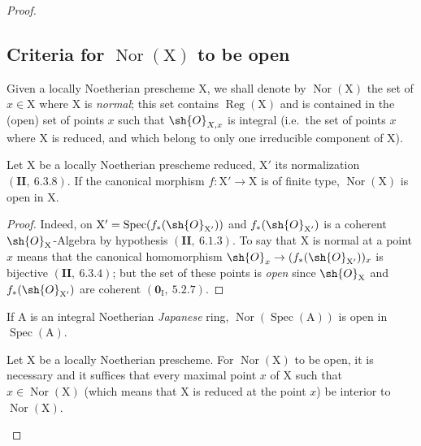 \begin{proof}
\subsection{Criteria for \texorpdfstring{$\operatorname{Nor}(\mathrm{X})$}{Nor(X)} to be open}
\label{subsection:IV.6.13}

\begin{env}[6.13.1]
\label{IV.6.13.1}
Given a locally Noetherian prescheme $\mathrm{X}$, we shall denote by
$\operatorname{Nor}(\mathrm{X})$ the set of $x\in\mathrm{X}$ where $\mathrm{X}$ is \emph{normal}; this set contains $\operatorname{Reg}(\mathrm{X})$ and is
contained in the (open) set of points $x$ such that $\sh{O}_{X,x}$ is integral (i.e.\ the set
of points $x$ where $\mathrm{X}$ is reduced, and which belong to only one irreducible component
of $\mathrm{X}$).
\end{env}

\begin{proposition}[6.13.2]
\label{IV.6.13.2}
Let $\mathrm{X}$ be a locally Noetherian prescheme reduced, $\mathrm{X}'$ its
normalization $(\mathbf{II},~6.3.8)$. If the canonical morphism $f:\mathrm{X}'\to\mathrm{X}$ is of finite type, $\operatorname{Nor}(\mathrm{X})$ is open in $\mathrm{X}$.
\end{proposition}

\begin{proof}
Indeed, on $\mathrm{X}'=\operatorname{Spec}(f_*(\sh{O}_{\mathrm{X}'}))$ and $f_*(\sh{O}_{\mathrm{X}'})$ is a coherent $\sh{O}_\mathrm{X}$-Algebra by
hypothesis $(\mathbf{II},~6.1.3)$. To say that $\mathrm{X}$ is normal at a point $x$ means that the canonical
homomorphism $\sh{O}_x\to(f_*(\sh{O}_{\mathrm{X}'}))_x$ is bijective $(\mathbf{II},~6.3.4)$; but the set of these points is \emph{open}
since $\sh{O}_\mathrm{X}$ and $f_*(\sh{O}_{\mathrm{X}'})$ are coherent $(\mathbf{0}_\mathrm{I},~5.2.7)$.
\end{proof}

\begin{corollary}[6.13.3]
\label{IV.6.13.3}
If $\mathrm{A}$ is an integral Noetherian \emph{Japanese} ring, $\operatorname{Nor}(\operatorname{Spec}(\mathrm{A}))$
is open in $\operatorname{Spec}(\mathrm{A})$.
\end{corollary}

\begin{proposition}[6.13.4]
\label{IV.6.13.4}
Let $\mathrm{X}$ be a locally Noetherian prescheme. For $\operatorname{Nor}(\mathrm{X})$
to be open, it is necessary and it suffices that every maximal point $x$ of $\mathrm{X}$ such that $x\in\operatorname{Nor}(\mathrm{X})$ (which means
that $\mathrm{X}$ is reduced at the point $x$) be interior to $\operatorname{Nor}(\mathrm{X})$.
\end{proposition}


\end{proof}
